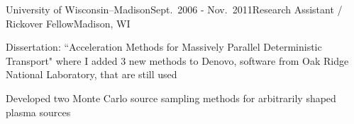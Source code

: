 \begin{rSubsection}{University of Wisconsin--Madison}{Sept.\ 2006 - Nov.\ 2011}{Research Assistant / Rickover Fellow}{Madison, WI}
\item Dissertation: ``Acceleration Methods for Massively Parallel Deterministic Transport" where I added 3 new methods to Denovo, software from Oak Ridge National Laboratory, that are still used%
\item Developed two Monte Carlo source sampling methods for arbitrarily shaped plasma sources%
\end{rSubsection}






